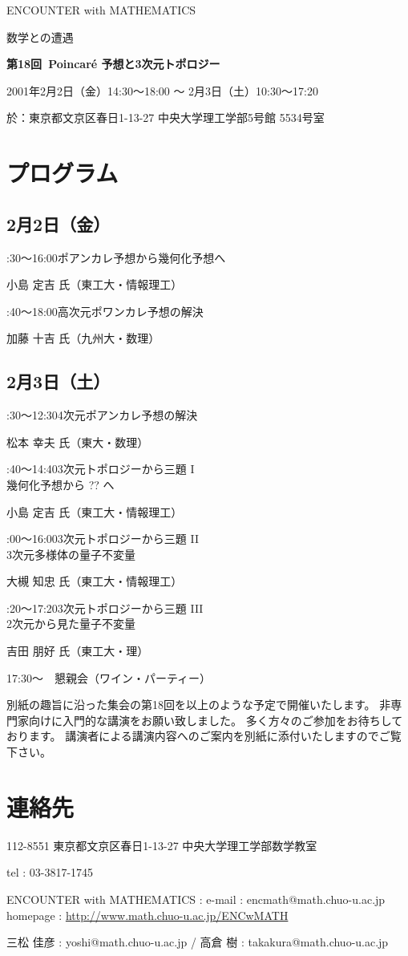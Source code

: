 \documentclass[uplatex,dvipdfmx]{jlreq}
\newcommand{\talk}[3]{%
\noindent
#1\quad #2\par
\hspace*{2em}#3\par\smallskip
}
\newcommand{\EwMnumber}{第18回}
\newcommand{\EwMtitle}{Poincaré 予想と3次元トポロジー}
\newcommand{\EwMdate}{2001年2月2日（金）14:30～18:00 ～ 2月3日（土）10:30～17:20}
\newcommand{\EwMplace}{東京都文京区春日1-13-27 中央大学理工学部5号館 5534号室}
\newcommand{\EwMtitleblock}{

\vspace*{-5mm}

\begin{center}

{\Large ENCOUNTER with MATHEMATICS}

\vspace{2mm}

{\large 数学との遭遇}

\vspace{4mm}

{\Large \bfseries \EwMnumber\ \EwMtitle}

\vspace{4mm}

\EwMdate

\vspace{2mm}

於：\EwMplace

\end{center}

\vspace{2mm}

}
\begin{document}
\EwMtitleblock


\section*{プログラム}

\subsection*{2月2日（金）}

\talk
{14:30～16:00}
{ポアンカレ予想から幾何化予想へ}
{小島 定吉 氏（東工大・情報理工）}

\talk
{16:40～18:00}
{高次元ポワンカレ予想の解決}
{加藤 十吉 氏（九州大・数理）}

\subsection*{2月3日（土）}

\talk
{10:30～12:30}
{4次元ポアンカレ予想の解決}
{松本 幸夫 氏（東大・数理）}

\talk
{13:40～14:40}
{3次元トポロジーから三題 I\\[1mm]幾何化予想から ?? へ}
{小島 定吉 氏（東工大・情報理工）}

\talk
{15:00～16:00}
{3次元トポロジーから三題 II\\[1mm]3次元多様体の量子不変量}
{大槻 知忠 氏（東工大・情報理工）}

\talk
{16:20～17:20}
{3次元トポロジーから三題 III\\[1mm]2次元から見た量子不変量}
{吉田 朋好 氏（東工大・理）}

\bigskip

17:30～　懇親会（ワイン・パーティー）


\bigskip

別紙の趣旨に沿った集会の第18回を以上のような予定で開催いたします。  
非専門家向けに入門的な講演をお願い致しました。  
多く方々のご参加をお待ちしております。  
講演者による講演内容へのご案内を別紙に添付いたしますのでご覧下さい。


\section*{連絡先}

112-8551 東京都文京区春日1-13-27 中央大学理工学部数学教室 

tel : 03-3817-1745  

ENCOUNTER with MATHEMATICS : e-mail : encmath@math.chuo-u.ac.jp  
homepage : \url{http://www.math.chuo-u.ac.jp/ENCwMATH}  

三松 佳彦 : yoshi@math.chuo-u.ac.jp / 高倉 樹 : takakura@math.chuo-u.ac.jp
\end{document}
